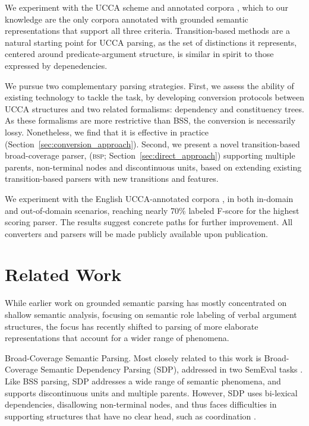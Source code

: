 \documentclass[11pt,letterpaper]{article}
\makeatletter
\newcommand{\secref}[1]{Section~\ref{#1}}
\renewcommand{\paragraph}{
  \@startsection{paragraph}{4}
  {\z@}{.3ex \@plus .3ex \@minus .2ex}{-1em}
  {\normalfont\normalsize\bfseries}
}
\makeatother
\begin{document}
We experiment with the UCCA scheme and annotated corpora \cite{abend2013universal},
which to our knowledge are the only corpora annotated with grounded semantic
representations that support all three criteria.
Transition-based methods are a natural starting point for UCCA parsing,
as the set of distinctions it represents, centered around predicate-argument
structure, is similar in spirit to those expressed by depenedencies.

We pursue two complementary parsing strategies.
First, we assess the ability of existing technology to tackle the task,
by developing conversion protocols between UCCA structures and two related formalisms:
dependency and constituency trees.
As these formalisms are more restrictive than BSS, the conversion
is necessarily lossy. Nonetheless, we find that it is effective
in practice (\secref{sec:conversion_approach}).
Second, we present a novel transition-based broad-coverage parser,
(\textsc{bsp}; \secref{sec:direct_approach})
supporting multiple parents, non-terminal nodes and discontinuous units,
based on extending existing transition-based parsers
with new transitions and features.

We experiment with the English UCCA-annotated corpora \cite{abend2013universal},
in both in-domain and out-of-domain scenarios, reaching
nearly 70\% labeled F-score for the highest scoring parser.
The results suggest concrete paths for further improvement.
All converters and parsers will be made publicly available upon publication.


\vspace{-.1cm}

\section{Related Work}\label{sec:related_work}
While earlier work on grounded semantic parsing has mostly concentrated on shallow semantic analysis,
focusing on semantic role labeling of verbal argument structures,
the focus has recently shifted to parsing of more elaborate representations that account
for a wider range of phenomena.


\paragraph{Broad-Coverage Semantic Parsing.}
Most closely related to this work is Broad-Coverage Semantic Dependency Parsing (SDP),
addressed in two SemEval tasks \cite{oepen2014semeval,oepen2015semeval}.
Like BSS parsing, SDP addresses a wide range of semantic phenomena,
and supports discontinuous units and multiple parents. However, SDP uses
bi-lexical dependencies, disallowing non-terminal nodes, and thus faces difficulties in supporting
structures that have no clear head, such as coordination \cite{Ivanova2012who}.
\end{document}
